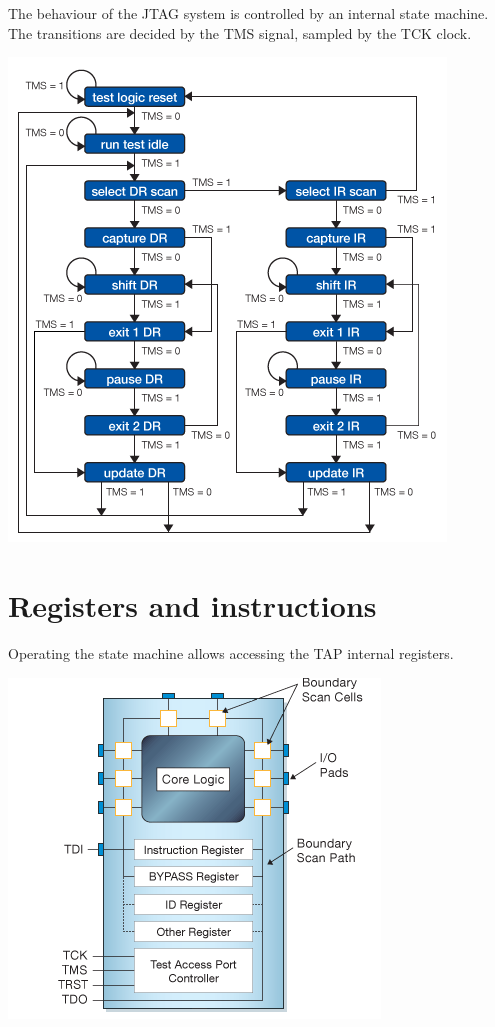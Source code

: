 \documentclass{article}
\begin{document}
	The behaviour of the JTAG system is controlled by an internal state machine. The transitions are decided by the TMS signal, sampled by the TCK clock.
	
	\begin{center}
	\includegraphics[scale=0.75]{tap_state_machine.png}
	\end{center}
	
	
	\section{Registers and instructions}
	
	Operating the state machine allows accessing the TAP internal registers.
	
	\begin{center}
	\includegraphics[scale=0.75]{tap.png}
	\end{center}
	
\end{document}
